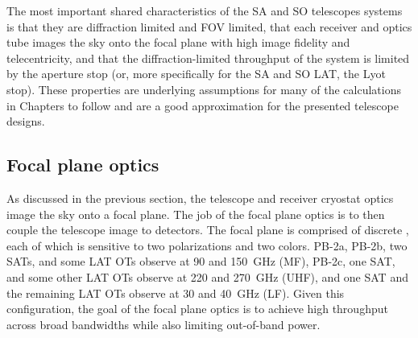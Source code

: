 The most important shared characteristics of the SA and SO telescopes systems is that they are diffraction limited and FOV limited, that each receiver and optics tube images the sky onto the focal plane with high image fidelity and telecentricity, and that the diffraction-limited throughput of the system is limited by the aperture stop (or, more specifically for the SA and SO LAT, the Lyot stop). These properties are underlying assumptions for many of the calculations in Chapters to follow and are a good approximation for the presented telescope designs.


\subsection{Focal plane optics}
\label{sec:focal_plane_optics}

As discussed in the previous section, the telescope and receiver cryostat optics image the sky onto a focal plane. The job of the focal plane optics is to then couple the telescope image to detectors. The focal plane is comprised of discrete , each of which is sensitive to two polarizations and two colors. PB-2a, PB-2b, two SATs, and some LAT OTs observe at 90 and 150~GHz (MF), PB-2c, one SAT, and some other LAT OTs observe at 220 and 270~GHz (UHF), and one SAT and the remaining LAT OTs observe at 30 and 40~GHz (LF).  Given this configuration, the goal of the focal plane optics is to achieve high throughput across broad bandwidths while also limiting out-of-band power.

